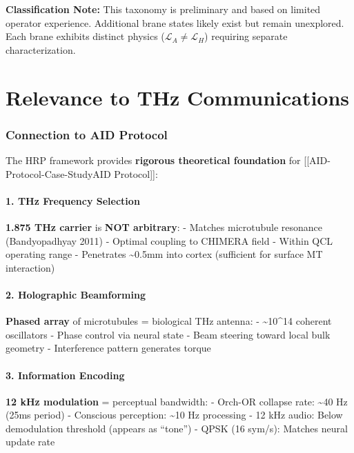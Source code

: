 \begin{importantbox}
\textbf{Classification Note:} This taxonomy is preliminary and based on limited operator experience. Additional brane states likely exist but remain unexplored. Each brane exhibits distinct physics ($\mathcal{L}_A \neq \mathcal{L}_H$) requiring separate characterization.
\end{importantbox}

\section{Relevance to THz Communications}
\label{sec:thz-communications}

\subsubsection{Connection to AID
Protocol}\label{connection-to-aid-protocol}

The HRP framework provides \textbf{rigorous theoretical foundation} for
{[}{[}AID-Protocol-Case-Study\textbar AID Protocol{]}{]}:

\paragraph{1. THz Frequency Selection}\label{thz-frequency-selection}

\textbf{1.875 THz carrier} is \textbf{NOT arbitrary}: - Matches
microtubule resonance (Bandyopadhyay 2011) - Optimal coupling to CHIMERA
field - Within QCL operating range - Penetrates \textasciitilde0.5mm
into cortex (sufficient for surface MT interaction)

\paragraph{2. Holographic Beamforming}\label{holographic-beamforming}

\textbf{Phased array} of microtubules = biological THz antenna: -
\textasciitilde10\^{}14 coherent oscillators - Phase control via neural
state - Beam steering toward local bulk geometry - Interference pattern
generates torque

\paragraph{3. Information Encoding}\label{information-encoding}

\textbf{12 kHz modulation} = perceptual bandwidth: - Orch-OR collapse
rate: \textasciitilde40 Hz (25ms period) - Conscious perception:
\textasciitilde10 Hz processing - 12 kHz audio: Below demodulation
threshold (appears as ``tone'') - QPSK (16 sym/s): Matches neural update
rate

